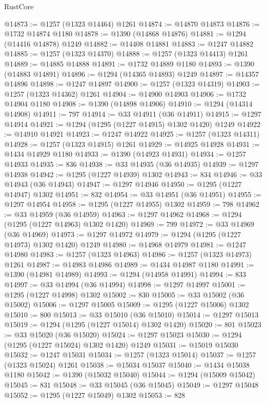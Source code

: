 \begin{lexlean}{RustCore}
\begin{coremodule}
@14873 := @1257 (@1323 @14464) @1261
@14874 := @14870 @14873
@14876 := @1732 @14874 @1180
@14878 := @1390 (@14868 @14876)
@14881 := @1294 (@14416 @14878) @1249
@14882 := @14408 @14881
@14883 := @1247 @14882
@14885 := @1257 (@1323 @14370)
@14888 := @1257 (@1323 @14413) @1261
@14889 := @14885 @14888
@14891 := @1732 @14889 @1180
@14893 := @1390 (@14883 @14891)
@14896 := @1294 (@14365 @14893) @1249
@14897 := @14357 @14896
@14898 := @1247 @14897
@14900 := @1257 (@1323 @14319)
@14903 := @1257 (@1323 @14362) @1261
@14904 := @14900 @14903
@14906 := @1732 @14904 @1180
@14908 := @1390 (@14898 @14906)
@14910 := @1294 (@14314 @14908)
@14911 := 797
@14914 := @33 @14911 (@36 @14911)
@14915 := @1297 @14914
@14921 := @1294 (@1295 (@1227 @14915) @1302 @1420) @1249
@14922 := @14910 @14921
@14923 := @1247 @14922
@14925 := @1257 (@1323 @14311)
@14928 := @1257 (@1323 @14915) @1261
@14929 := @14925 @14928
@14931 := @1434 @14929 @1180
@14933 := @1390 (@14923 @14931)
@14934 := @1257 @14933
@14935 := 836
@14938 := @33 @14935 (@36 @14935)
@14939 := @1297 @14938
@14942 := @1295 (@1227 @14939) @1302
@14943 := 834
@14946 := @33 @14943 (@36 @14943)
@14947 := @1297 @14946
@14950 := @1295 (@1227 @14947) @1302
@14951 := 832
@14954 := @33 @14951 (@36 @14951)
@14955 := @1297 @14954
@14958 := @1295 (@1227 @14955) @1302
@14959 := 798
@14962 := @33 @14959 (@36 @14959)
@14963 := @1297 @14962
@14968 := @1294 (@1295 (@1227 @14963) @1302 @1420)
@14969 := 799
@14972 := @33 @14969 (@36 @14969)
@14973 := @1297 @14972
@14979 := @1294 (@1295 (@1227 @14973) @1302 @1420) @1249
@14980 := @14968 @14979
@14981 := @1247 @14980
@14983 := @1257 (@1323 @14963)
@14986 := @1257 (@1323 @14973) @1261
@14987 := @14983 @14986
@14989 := @1434 @14987 @1180
@14991 := @1390 (@14981 @14989)
@14993 := @1294 (@14958 @14991)
@14994 := 833
@14997 := @33 @14994 (@36 @14994)
@14998 := @1297 @14997
@15001 := @1295 (@1227 @14998) @1302
@15002 := 830
@15005 := @33 @15002 (@36 @15002)
@15006 := @1297 @15005
@15009 := @1295 (@1227 @15006) @1302
@15010 := 800
@15013 := @33 @15010 (@36 @15010)
@15014 := @1297 @15013
@15019 := @1294 (@1295 (@1227 @15014) @1302 @1420)
@15020 := 801
@15023 := @33 @15020 (@36 @15020)
@15024 := @1297 @15023
@15030 := @1294 (@1295 (@1227 @15024) @1302 @1420) @1249
@15031 := @15019 @15030
@15032 := @1247 @15031
@15034 := @1257 (@1323 @15014)
@15037 := @1257 (@1323 @15024) @1261
@15038 := @15034 @15037
@15040 := @1434 @15038 @1180
@15042 := @1390 (@15032 @15040)
@15044 := @1294 (@15009 @15042)
@15045 := 831
@15048 := @33 @15045 (@36 @15045)
@15049 := @1297 @15048
@15052 := @1295 (@1227 @15049) @1302
@15053 := 828

\end{coremodule}
\end{lexlean}
